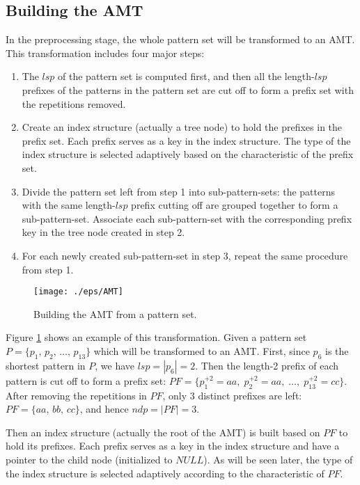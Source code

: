 \documentclass[legalpaper]{article}
\begin{document}
\subsection{Building the AMT}
\label{subsec:preprocessing}

In the preprocessing stage, the whole pattern set will be transformed
to an \textsf{AMT}. This transformation includes four major steps:

\begin{enumerate}
\item The $lsp$ of the pattern set is computed first, and then all the
length-$lsp$ prefixes of the patterns in the pattern set are cut off
to form a prefix set with the repetitions removed.
\item Create an index structure (actually a tree node) to hold the
prefixes in the prefix set. Each prefix serves as a key in the index
structure. The type of the index structure is selected adaptively
based on the characteristic of the prefix set.
\item Divide the pattern set left from step 1 into sub-pattern-sets:
the patterns with the same length-$lsp$ prefix cutting off are grouped
together to form a sub-pattern-set. Associate each sub-pattern-set with
the corresponding prefix key in the tree node created in step 2.
\item For each newly created sub-pattern-set in step 3, repeat the
same procedure from step 1.
\end{enumerate}

\begin{figure}[htbp]
  \label{fig:AMT}
  \centering
  \texttt{[image: ./eps/AMT]}
  \caption{Building the AMT from a pattern set.}
\end{figure}

Figure \ref{fig:AMT} shows an example of this transformation. Given a
pattern set $P = \{p_1,\, p_2,\, \dots,\, p_{13}\}$ which will be
transformed to an \textsf{AMT}.  First, since $p_6$ is the shortest
pattern in $P$, we have $lsp = |p_6| = 2$. Then the length-2 prefix of
each pattern is cut off to form a prefix set: $PF = \{p_1^{+2} = aa,\;
p_2^{+2} = aa,\; \dots,\; p_{13}^{+2} = cc\}$.  After removing the
repetitions in $PF$, only 3 distinct prefixes are left: $PF = \{aa,\,
bb,\, cc\}$, and hence $ndp = |PF| = 3$.

Then an index structure (actually the root of the \textsf{AMT}) is
built based on $PF$ to hold its prefixes. Each prefix serves as a
\textsf{key} in the index structure and have a pointer to the child
node (initialized to $NULL$). As will be seen later, the type of the
index structure is selected adaptively according to the characteristic
of $PF$.
\end{document}
